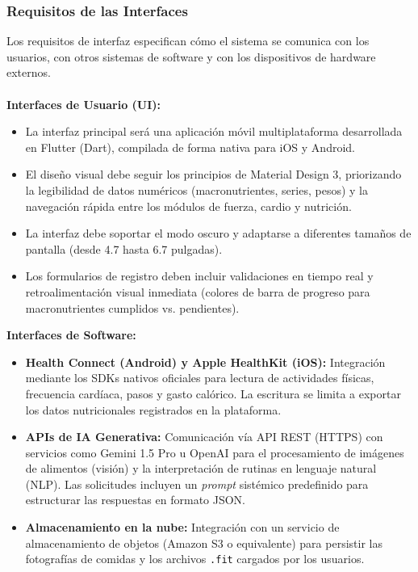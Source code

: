 \documentclass[12pt]{article}
\begin{document}
\subsubsection{Requisitos de las Interfaces}
Los requisitos de interfaz especifican cómo el sistema se comunica con los usuarios, con otros sistemas de software y con los dispositivos de hardware externos.
\\\\
\textbf{Interfaces de Usuario (UI):}
\begin{itemize}
    \item La interfaz principal será una aplicación móvil multiplataforma desarrollada en Flutter (Dart), compilada de forma nativa para iOS y Android.
    \item El diseño visual debe seguir los principios de Material Design 3, priorizando la legibilidad de datos numéricos (macronutrientes, series, pesos) y la navegación rápida entre los módulos de fuerza, cardio y nutrición.
    \item La interfaz debe soportar el modo oscuro y adaptarse a diferentes tamaños de pantalla (desde 4.7 hasta 6.7 pulgadas).
    \item Los formularios de registro deben incluir validaciones en tiempo real y retroalimentación visual inmediata (colores de barra de progreso para macronutrientes cumplidos vs. pendientes).
\end{itemize}

\textbf{Interfaces de Software:}
\begin{itemize}
    \item \textbf{Health Connect (Android) y Apple HealthKit (iOS):} Integración mediante los SDKs nativos oficiales para lectura de actividades físicas, frecuencia cardíaca, pasos y gasto calórico. La escritura se limita a exportar los datos nutricionales registrados en la plataforma.
    \item \textbf{APIs de IA Generativa:} Comunicación vía API REST (HTTPS) con servicios como Gemini 1.5 Pro u OpenAI para el procesamiento de imágenes de alimentos (visión) y la interpretación de rutinas en lenguaje natural (NLP). Las solicitudes incluyen un \textit{prompt} sistémico predefinido para estructurar las respuestas en formato JSON.
    \item \textbf{Almacenamiento en la nube:} Integración con un servicio de almacenamiento de objetos (Amazon S3 o equivalente) para persistir las fotografías de comidas y los archivos \texttt{.fit} cargados por los usuarios.
\end{itemize}
\end{document}
